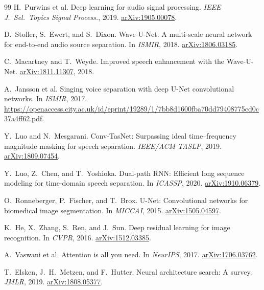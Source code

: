 \documentclass[10pt,twocolumn,letterpaper]{article}
\theoremstyle{remark}
\begin{document}
{\begin{thebibliography}{99}
H.~Purwins et al.
\newblock Deep learning for audio signal processing.
\newblock \emph{IEEE J.\ Sel.\ Topics Signal Process.}, 2019.
\newblock \href{https://arxiv.org/abs/1905.00078}{arXiv:1905.00078}.

D.~Stoller, S.~Ewert, and S.~Dixon.
\newblock Wave-U-Net: A multi-scale neural network for end-to-end audio source separation.
\newblock In \emph{ISMIR}, 2018.
\newblock \href{https://arxiv.org/abs/1806.03185}{arXiv:1806.03185}.

C.~Macartney and T.~Weyde.
\newblock Improved speech enhancement with the Wave-U-Net.
\newblock \href{https://arxiv.org/abs/1811.11307}{arXiv:1811.11307}, 2018.

A.~Jansson et al.
\newblock Singing voice separation with deep U-Net convolutional networks.
\newblock In \emph{ISMIR}, 2017.
\newblock \url{https://openaccess.city.ac.uk/id/eprint/19289/1/7bb8d1600fba70dd79408775cd0c37a4ff62.pdf}.

Y.~Luo and N.~Mesgarani.
\newblock Conv-TasNet: Surpassing ideal time--frequency magnitude masking for speech separation.
\newblock \emph{IEEE/ACM TASLP}, 2019.
\newblock \href{https://arxiv.org/abs/1809.07454}{arXiv:1809.07454}.

Y.~Luo, Z.~Chen, and T.~Yoshioka.
\newblock Dual-path RNN: Efficient long sequence modeling for time-domain speech separation.
\newblock In \emph{ICASSP}, 2020.
\newblock \href{https://arxiv.org/abs/1910.06379}{arXiv:1910.06379}.

O.~Ronneberger, P.~Fischer, and T.~Brox.
\newblock U-Net: Convolutional networks for biomedical image segmentation.
\newblock In \emph{MICCAI}, 2015.
\newblock \href{https://arxiv.org/abs/1505.04597}{arXiv:1505.04597}.

K.~He, X.~Zhang, S.~Ren, and J.~Sun.
\newblock Deep residual learning for image recognition.
\newblock In \emph{CVPR}, 2016.
\newblock \href{https://arxiv.org/abs/1512.03385}{arXiv:1512.03385}.

A.~Vaswani et al.
\newblock Attention is all you need.
\newblock In \emph{NeurIPS}, 2017.
\newblock \href{https://arxiv.org/abs/1706.03762}{arXiv:1706.03762}.

T.~Elsken, J.~H.~Metzen, and F.~Hutter.
\newblock Neural architecture search: A survey.
\newblock \emph{JMLR}, 2019.
\newblock \href{https://arxiv.org/abs/1808.05377}{arXiv:1808.05377}.


\end{thebibliography}}
\end{document}
